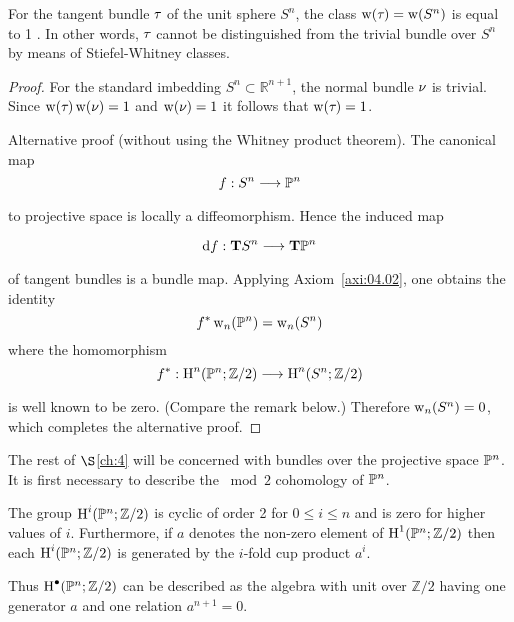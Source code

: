 \documentclass[../main]{subfiles}
\begin{document}
\begin{example}
\label{exa:04.01}
For the tangent bundle $\tau_{}$ of the unit sphere $S^{n}$, the class \newline $\operatorname{w}(\tau_{}) =\operatorname{w}(S^{n})$ is equal to 1 . In other words, $\tau_{}$ cannot be distinguished from the trivial bundle over $S^{n}$ by means of Stiefel-Whitney classes.
\end{example}
\begin{proof}
For the standard imbedding $S^{n} \subset \mathbb{R}^{n+1}$, the normal bundle $\nu_{}$ is trivial. Since $\operatorname{w}(\tau_{}) \operatorname{w}(\nu_{})=1$ and $\operatorname{w}(\nu_{})=1$ it follows that $\operatorname{w}(\tau_{})=1$.


Alternative proof (without using the Whitney product theorem). The \mbox{canonical} map
\[
f: S^{n} \varrightarrow{} \projective^{n}
\]
to projective space is locally a diffeomorphism. Hence the induced map

\[
\tangentbundlemap{f}: \tangentTS S^{n} \varrightarrow{} \tangentTS \projective^{n}
\]
of tangent bundles is a bundle map. Applying Axiom~\ref{axi:04.02}, one obtains the identity
\[
f^{*} \operatorname{w}_{n}(\mathbb{P}^{n})=\operatorname{w}_{n}(S^{n})
\]
where the homomorphism
\[
f^{*}: \homology^{n}(\projective^{n}; \mathbb{Z} / 2) \varrightarrow{} \homology^{n}(S^{n}; \mathbb{Z} / 2)
\]
is well known to be zero. (Compare the remark below.) Therefore $\operatorname{w}_{n}(S^{n})=0$, which completes the alternative proof.

\end{proof}

The rest of $\S $\ref{ch:4} will be concerned with bundles over the projective space $\mathbb{P}^{n}$. It is first necessary to describe the $\bmod 2$ cohomology of $\mathbb{P}^{n}$.

\begin{lemma}
\label{lem:04.03}
The group $\operatorname{H}^i(\mathbb{P}^n; \mathbb{Z} / 2)$ is cyclic of order 2 for $0 \leq i \leq n$ and is zero for higher values of $i$. Furthermore, if $a$ denotes the non-zero element of $\operatorname{H}^1(\mathbb{P}^{n}; \mathbb{Z} / 2)$ then each $\operatorname{H}^i(\mathbb{P}^{n}; \mathbb{Z} / 2)$ is generated by the $i$-fold cup product $a^i$.
\end{lemma}

Thus $\operatorname{H}^\bullet(\mathbb{P}^{n}; \mathbb{Z} / 2)$ can be described as the algebra with unit over $\mathbb{Z} / 2$ having one generator $a$ and one relation $a^{n+1}=0$.
\end{document}
